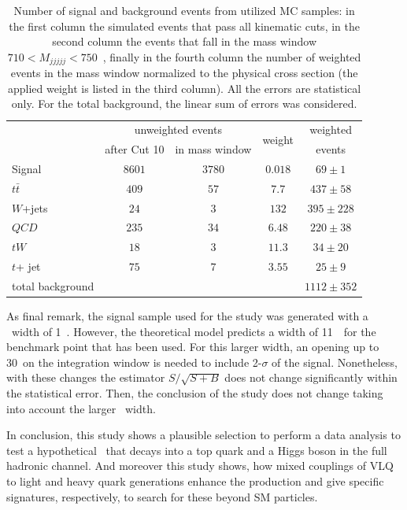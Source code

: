 \begin{table}[tb]
\begin{center}
\begin{tabular}{l|c|c|c|c}
 & \multicolumn{2}{c|}{unweighted events}  & \multirow{2}{*}{weight} & weighted  \\
 & after Cut 10 & in mass window & & events \\
 \hline
 Signal & $8601$ & $3780$ & $0.018$ &$69 \pm 1$ \\
 \hline
   $t \bar{t}$ & $409$ & $57$ & $7.7$ & $437 \pm 58$ \\
 $W$+jets & $24$ & $3$ & $132$ & $395 \pm 228$ \\
 $QCD$ & $235$ & $34$ & $6.48$ & $220 \pm 38$ \\
 $tW$ & $18$ & $3$ & $11.3$ & $34 \pm 20$ \\
 $t$+ jet & $75$ & $7$ & $3.55$ & $25 \pm 9$ \\
  \hline
  total background & & & & $1112 \pm 352$ \\
\end{tabular}
\caption{Number of signal and background events from utilized MC samples: in the first column the simulated events that pass all kinematic cuts, in the second column the events that fall in the mass window ${710<M_{jjjjj}<750}$~\GeVcc, finally in the fourth column the number of weighted events in the mass window normalized to the physical cross section (the applied weight is listed in the third column). All the errors are statistical only. For the total background, the linear sum of errors was considered.} \label{tab:events} 
\end{center}
\end{table}

As final remark, the signal sample used for the study was generated with a \Tp~width of 1~\GeVcc. However, the theoretical model predicts a width of 11~\GeVcc~for the benchmark point that has been used. For this larger width, an opening up to 30~\GeVcc on the integration window is needed to include 2-$\sigma$ of the signal. Nonetheless, with these changes the estimator $S/\sqrt{S+B}$ does not change significantly within the statistical error. Then, the conclusion of the study does not change taking into account the larger \Tp~width.

In conclusion, this study shows a plausible selection to perform a data analysis to test a hypothetical \Tp~that decays into a top quark and a Higgs boson in the full hadronic channel. And moreover this study shows, how mixed couplings of VLQ to light and heavy quark generations enhance the production and give specific signatures, respectively, to search for these beyond SM particles. 

